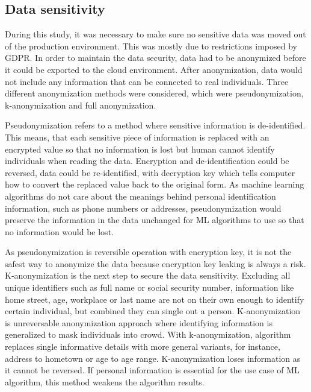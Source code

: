 
\subsection{Data sensitivity}\label{subsec:bg-data-sensitivity}

During this study,
it was necessary to make sure no sensitive data
was moved out of the production environment.
This was mostly due to restrictions imposed by GDPR\@.
In order to maintain the data security,
data had to be anonymized
before it could be exported to the cloud environment.
After anonymization,
data would not include any information
that can be connected to real individuals.
Three different anonymization methods were considered,
which were pseudonymization, k-anonymization and full anonymization.

Pseudonymization refers to a method
where sensitive information is de-identified.
This means,
that each sensitive piece of information
is replaced with an encrypted value
so that no information is lost
but human cannot identify individuals
when reading the data.
Encryption and de-identification
could be reversed, \ie data could be re-identified,
with decryption key which tells computer
how to convert the replaced value back to the original form.
As machine learning algorithms do not care about the meanings
behind personal identification information,
such as phone numbers or addresses,
pseudonymization would preserve the information in the data unchanged
for ML algorithms to use so that no information would be lost.~\cite{noumeir2007pseudonymization}

As pseudonymization is reversible operation with encryption key,
it is not the safest way to anonymize the data
because encryption key leaking is always a risk.
K-anonymization is the next step to secure the data sensitivity.
Excluding all unique identifiers such as full name or social security number,
information like home street, age, workplace or last name
are not on their own enough to identify certain individual,
but combined they can single out a person.
K-anonymization is unreversable anonymization approach
where identifying information is generalized
to mask individuals into crowd.
With k-anonymization,
algorithm replaces single informative details
with more general variants,
for instance,
address to hometown or age to age range.
K-anonymization loses information
as it cannot be reversed.
If personal information is essential for the use case of ML algorithm,
this method weakens the algorithm results.~\cite{byun2007efficient}

